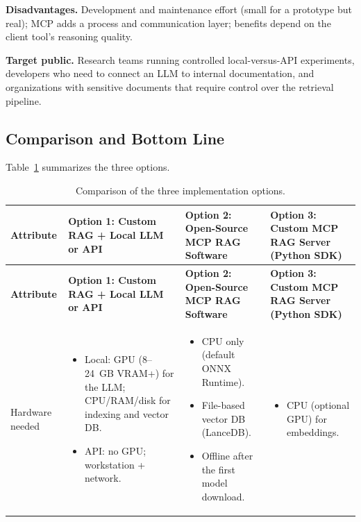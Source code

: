 \documentclass[11pt,a4paper]{article}
\begin{document}
\textbf{Disadvantages.} Development and maintenance effort (small for a
prototype but real); MCP adds a process and communication layer; benefits
depend on the client tool's reasoning quality.

\textbf{Target public.} Research teams running controlled local-versus-API
experiments, developers who need to connect an LLM to internal documentation,
and organizations with sensitive documents that require control over the
retrieval pipeline.

\subsection{Comparison and Bottom Line}

Table~\ref{tab:options} summarizes the three options.

\begin{longtable}{>{\raggedright\arraybackslash}p{2.2cm}>{\raggedright\arraybackslash}p{4.2cm}>{\raggedright\arraybackslash}p{4.2cm}>{\raggedright\arraybackslash}p{4.2cm}}
\caption{Comparison of the three implementation options.}
\label{tab:options}\\
\toprule
\textbf{Attribute} & \textbf{Option 1: Custom RAG + Local LLM or API} & \textbf{Option 2: Open-Source MCP RAG Software} & \textbf{Option 3: Custom MCP RAG Server (Python SDK)} \\
\midrule
\endfirsthead
\toprule
\textbf{Attribute} & \textbf{Option 1: Custom RAG + Local LLM or API} & \textbf{Option 2: Open-Source MCP RAG Software} & \textbf{Option 3: Custom MCP RAG Server (Python SDK)} \\
\midrule
\endhead
Hardware needed &
\begin{itemize}[leftmargin=1.2em, nosep, topsep=0pt]
  \item Local: GPU (8--24~GB VRAM+) for the LLM; CPU/RAM/disk for indexing and vector DB.
  \item API: no GPU; workstation + network.
\end{itemize} &
\begin{itemize}[leftmargin=1.2em, nosep, topsep=0pt]
  \item CPU only (default ONNX Runtime).
  \item File-based vector DB (LanceDB).
  \item Offline after the first model download.
\end{itemize} &
\begin{itemize}[leftmargin=1.2em, nosep, topsep=0pt]
  \item CPU (optional GPU) for embeddings.

\end{itemize}
\end{longtable}
\end{document}
